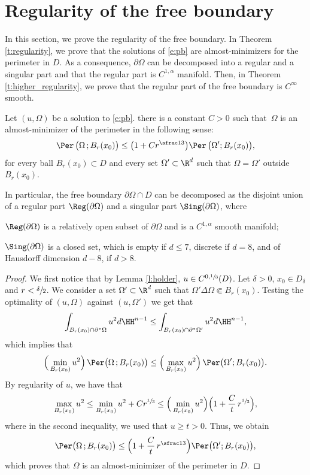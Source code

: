 \section{Regularity of the free boundary}\label{s:regularity}
In this section, we prove the regularity of the free boundary. In Theorem \ref{t:regularity}, we prove that the solutions of \eqref{e:pb} are almost-minimizers for the perimeter in $D$. As a consequence, $\partial\Omega$ can be decomposed into a regular and a singular part and that the regular part is $C^{1,\alpha}$ manifold. Then, in Theorem \ref{t:higher_regularity}, we prove that the regular part of the free boundary is $C^\infty$ smooth.
\begin{teo}\label{t:regularity}
Let $(u,\Omega)$ be a solution to \eqref{e:pb}.
there is a constant $C>0$ such that~$\Omega$ is an almost-minimizer of the perimeter in the following sense:
\[\Per\,\big(\Omega\,; B_r(x_0)\big) \leq \big(1 + Cr^{\sfrac13} \big) \Per\,\big(\Omega'; B_r(x_0)\big),\]
for every ball $B_r(x_0)\subset D$ and every set $\Omega'\subset \R^d$ such that $\Omega=\Omega'$ outside $B_r(x_0)$.

In particular, the free boundary $\partial\Omega\cap D$ can be decomposed as the disjoint union of a regular part $\Reg(\partial\Omega)$ and a singular part $\Sing(\partial\Omega)$, where
\begin{enumeratei}
\item $\Reg(\partial\Omega)$ is a relatively open subset of $\partial\Omega$ and is a $C^{1,\alpha}$ smooth manifold;
\item $\Sing(\partial\Omega)$ is a closed set, which is empty if $d\le 7$, discrete if $d=8$, and of Hausdorff dimension $d-8$, if $d>8$.
\end{enumeratei}
\end{teo}
\begin{proof}
We first notice that by Lemma \ref{l:holder}, $u \in C^{0,\sfrac13}(D)$. Let $\delta>0$, $x_0\in D_\delta$ and $r<\sfrac{\delta}2$. We consider a set $\Omega'\subset \R^d$ such that $\Omega'\Delta \Omega \Subset B_r(x_0)$. Testing the optimality of $(u,\Omega)$ against $(u,\Omega')$ we get that
\begin{align*}
\int_{B_r(x_0)\cap \partial^\ast \Omega}u^2d\HH^{n-1} \leq \int_{B_r(x_0)\cap \partial^\ast \Omega'}u^2d\HH^{n-1},
\end{align*}
which implies that
\[\Big(\min_{B_r(x_0)} u^2\Big)\, \Per\big(\Omega\,; B_r(x_0)\big) \leq \Big(\max_{B_r(x_0)} u^2\Big)\, \Per\big(\Omega'; B_r(x_0)\big).\]
By regularity of $u$, we have that
\[\max_{B_r(x_0)} u^2 \leq \min_{B_r(x_0)} u^2 + Cr^{\sfrac13}\le \Big(\min_{B_r(x_0)} u^2\Big)\Bigl(1+\frac{C}{t}\,r^{\sfrac13}\Bigr),\]
where in the second inequality, we used that $u\ge t>0$. Thus, we obtain
\[\Per\big(\Omega\,; B_r(x_0)\big) \leq \Bigl(1 + \frac{C}{t}\,r^{\sfrac13} \Bigr) \Per\big(\Omega'; B_r(x_0)\big),\]
which proves that $\Omega$ is an almost-minimizer of the perimeter in $D$.
\end{proof}

